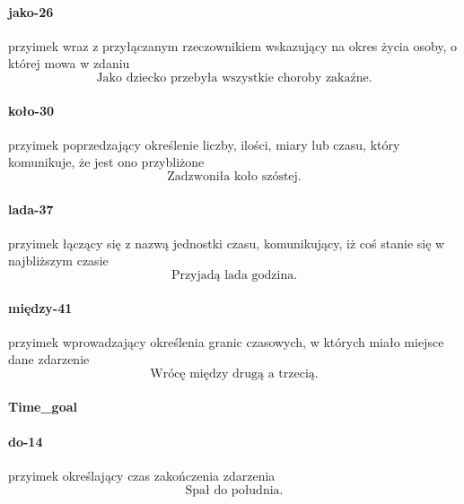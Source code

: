 \documentclass[a4paper, 12pt]{article}
\theoremstyle{remark}
\begin{document}
\paragraph{jako-26} \label{prep-26}	przyimek wraz z przyłączanym rzeczownikiem wskazujący na okres życia osoby, o której mowa w zdaniu
\begin{equation}
\text{Jako dziecko przebyła wszystkie choroby zakaźne.}
\end{equation}
\paragraph{koło-30} \label{prep-30}	przyimek poprzedzający określenie liczby, ilości, miary lub czasu, który komunikuje, że jest ono przybliżone
\begin{equation}
\text{Zadzwoniła koło szóstej.}
\end{equation}
\paragraph{lada-37} \label{prep-37}	przyimek łączący się z nazwą jednostki czasu, komunikujący, iż coś stanie się w najbliższym czasie
\begin{equation}
\text{Przyjadą lada godzina.}
\end{equation}
\paragraph{między-41} \label{prep-41}	przyimek wprowadzający określenia granic czasowych, w których miało miejsce dane zdarzenie
\begin{equation}
\text{Wrócę między drugą a trzecią.}
\end{equation}

\paragraph{Time\_goal} %
\label{sub:time_goal}
\paragraph{do-14} \label{prep-14}	przyimek określający czas zakończenia zdarzenia
\begin{equation}
\text{Spał do południa.}
\end{equation}

\end{document}
